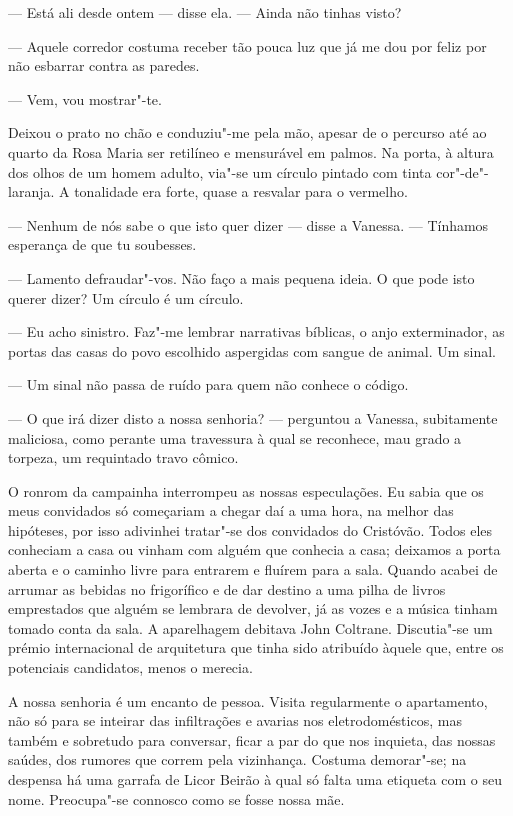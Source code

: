 --- Está ali desde ontem --- disse ela. --- Ainda não tinhas visto?

--- Aquele corredor costuma receber tão pouca luz que já
me dou por feliz por não esbarrar contra as paredes.

--- Vem, vou mostrar"-te.

Deixou o prato no chão e conduziu"-me pela mão, apesar de o percurso até
ao quarto da Rosa Maria ser retilíneo e mensurável em palmos. Na porta,
à altura dos olhos de um homem adulto, via"-se um círculo pintado com
tinta cor"-de"-laranja. A tonalidade era forte, quase a resvalar para o vermelho.

--- Nenhum de nós sabe o que isto quer dizer --- disse a Vanessa. ---
  Tínhamos esperança de que tu soubesses.

--- Lamento defraudar"-vos. Não faço a mais pequena ideia. O que pode isto
  querer dizer? Um círculo é um círculo.

--- Eu acho sinistro. Faz"-me lembrar narrativas bíblicas, o anjo
  exterminador, as portas das casas do povo escolhido aspergidas com
  sangue de animal. Um sinal.

--- Um sinal não passa de ruído para quem não conhece o código.

--- O que irá dizer disto a nossa senhoria? --- perguntou a Vanessa,
  subitamente maliciosa, como perante uma travessura à qual se
  reconhece, mau grado a torpeza, um requintado travo cômico.

O ronrom da campainha interrompeu as nossas especulações. Eu sabia que
os meus convidados só começariam a chegar daí a uma hora, na melhor
das hipóteses, por isso adivinhei tratar"-se dos convidados do Cristóvão.
Todos eles conheciam a casa ou vinham com alguém que conhecia a casa;
deixamos a porta aberta e o caminho livre para entrarem e fluírem para a
sala. Quando acabei de arrumar as bebidas no frigorífico e de dar
destino a uma pilha de livros emprestados que alguém se lembrara de
devolver, já as vozes e a música tinham tomado conta da sala. A
aparelhagem debitava John Coltrane.
Discutia"-se um prémio internacional de arquitetura que tinha sido
atribuído àquele que, entre os potenciais candidatos, menos o merecia.


\medskip
\asterisc
\medskip

A nossa senhoria é um encanto de pessoa. Visita regularmente o
apartamento, não só para se inteirar das infiltrações e avarias nos
eletrodomésticos, mas também e sobretudo para conversar, ficar a par
do que nos inquieta, das nossas saúdes, dos rumores que correm pela
vizinhança. Costuma demorar"-se; na despensa há uma garrafa de Licor
Beirão à qual só falta uma etiqueta com o seu nome. Preocupa"-se connosco
como se fosse nossa mãe.

